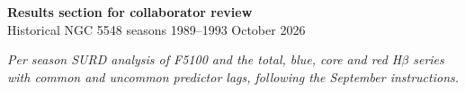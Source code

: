 \documentclass[11pt,a4paper]{article}
\begin{document}
\begin{center}
{\large\bfseries Results section for collaborator review}\\[4pt]
Historical NGC 5548 seasons 1989--1993 October 2026
\end{center}
\noindent\textit{Per season SURD analysis of F5100 and the total, blue, core and red
H$\beta$ series with common and uncommon predictor lags, following the
September instructions.}


\end{document}
